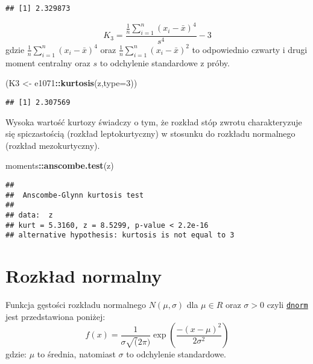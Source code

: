 \documentclass[polish,]{book}
\newenvironment{Shaded}{\begin{snugshade}}{\end{snugshade}}
\newcommand{\DataTypeTok}[1]{\textcolor[rgb]{0.13,0.29,0.53}{#1}}
\newcommand{\DecValTok}[1]{\textcolor[rgb]{0.00,0.00,0.81}{#1}}
\newcommand{\KeywordTok}[1]{\textcolor[rgb]{0.13,0.29,0.53}{\textbf{#1}}}
\newcommand{\NormalTok}[1]{#1}
\newcommand{\OperatorTok}[1]{\textcolor[rgb]{0.81,0.36,0.00}{\textbf{#1}}}
\newcommand{\StringTok}[1]{\textcolor[rgb]{0.31,0.60,0.02}{#1}}
\begin{document}
\begin{verbatim}
## [1] 2.329873
\end{verbatim}

\begin{equation}
K_{3}=\frac{\frac{1}{n}\sum_{i=1}^{n}(x_i-\bar{x})^4}{s^4}-3
\label{eq:wz919}
\end{equation}
gdzie \(\frac{1}{n}\sum_{i=1}^{n}(x_i-\bar{x})^4\) oraz \(\frac{1}{n}\sum_{i=1}^{n}(x_i-\bar{x})^2\) to odpowiednio czwarty i drugi moment
centralny oraz \(s\) to odchylenie standardowe z próby.

\begin{Shaded}
\begin{Highlighting}[]
\NormalTok{(K3 <-}\StringTok{ }\NormalTok{e1071}\OperatorTok{::}\KeywordTok{kurtosis}\NormalTok{(z,}\DataTypeTok{type=}\DecValTok{3}\NormalTok{))}
\end{Highlighting}
\end{Shaded}

\begin{verbatim}
## [1] 2.307569
\end{verbatim}

Wysoka wartość kurtozy świadczy o tym, że rozkład stóp zwrotu charakteryzuje się
spiczastością (rozkład leptokurtyczny) w stosunku do rozkładu normalnego (rozkład
mezokurtyczny).

\begin{Shaded}
\begin{Highlighting}[]
\NormalTok{moments}\OperatorTok{::}\KeywordTok{anscombe.test}\NormalTok{(z)}
\end{Highlighting}
\end{Shaded}

\begin{verbatim}
## 
##  Anscombe-Glynn kurtosis test
## 
## data:  z
## kurt = 5.3160, z = 8.5299, p-value < 2.2e-16
## alternative hypothesis: kurtosis is not equal to 3
\end{verbatim}

\hypertarget{part_9.3}{%
\section{Rozkład normalny}\label{part_9.3}}

Funkcja gęstości rozkładu normalnego \(N(\mu,\sigma)\) dla \(\mu\in R\) oraz \(\sigma>0\) czyli \href{https://rdrr.io/r/stats/Normal.html}{\texttt{dnorm}} jest przedstawiona poniżej:
\begin{equation}
f(x)=\frac{1}{\sigma\sqrt(2\pi)}\exp\left(\frac{-(x-\mu)^2}{2\sigma^2}\right)
\label{eq:wz920}
\end{equation}
gdzie: \(\mu\) to średnia, natomiast \(\sigma\) to odchylenie standardowe.
\end{document}
